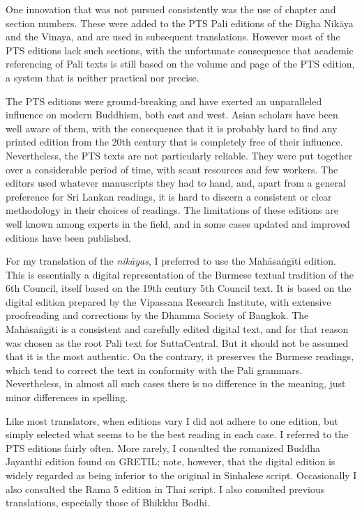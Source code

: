 \documentclass[12pt,openany]{book}%
\begin{document}
One innovation that was not pursued consistently was the use of chapter and section numbers. These were added to the PTS Pali editions of the \textsanskrit{Dīgha} \textsanskrit{Nikāya} and the Vinaya, and are used in subsequent translations. However most of the PTS editions lack such sections, with the unfortunate consequence that academic referencing of Pali texts is still based on the volume and page of the PTS edition, a system that is neither practical nor precise.

The PTS editions were ground-breaking and have exerted an unparalleled influence on modern Buddhism, both east and west. Asian scholars have been well aware of them, with the consequence that it is probably hard to find any printed edition from the 20th century that is completely free of their influence. Nevertheless, the PTS texts are not particularly reliable. They were put together over a considerable period of time, with scant resources and few workers. The editors used whatever manuscripts they had to hand, and, apart from a general preference for Sri Lankan readings, it is hard to discern a consistent or clear methodology in their choices of readings. The limitations of these editions are well known among experts in the field, and in some cases updated and improved editions have been published.

For my translation of the \textit{\textsanskrit{nikāyas}}, I preferred to use the \textsanskrit{Mahāsaṅgīti} edition. This is essentially a digital representation of the Burmese textual tradition of the 6th Council, itself based on the 19th century 5th Council text. It is based on the digital edition prepared by the Vipassana Research Institute, with extensive proofreading and corrections by the Dhamma Society of Bangkok. The \textsanskrit{Mahāsaṅgīti} is a consistent and carefully edited digital text, and for that reason was chosen as the root Pali text for SuttaCentral. But it should not be assumed that it is the most authentic. On the contrary, it preserves the Burmese readings, which tend to correct the text in conformity with the Pali grammars. Nevertheless, in almost all such cases there is no difference in the meaning, just minor differences in spelling.

Like most translators, when editions vary I did not adhere to one edition, but simply selected what seems to be the best reading in each case. I referred to the PTS editions fairly often. More rarely, I consulted the romanized Buddha Jayanthi edition found on GRETIL; note, however, that the digital edition is widely regarded as being inferior to the original in Sinhalese script. Occasionally I also consulted the Rama 5 edition in Thai script. I also consulted previous translations, especially those of Bhikkhu Bodhi.
\end{document}
